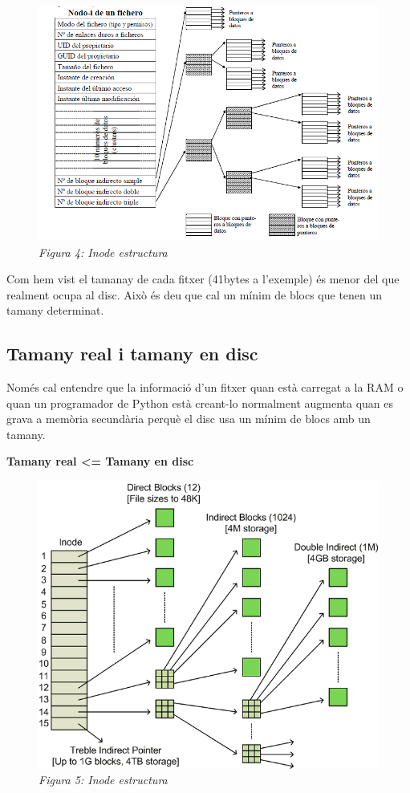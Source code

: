 \documentclass[
  12 pt,
  a4paper,
]{article}
\begin{document}
\begin{figure}
\centering
\includegraphics{png/inodo_estructura.png}
\caption{\emph{Figura 4: Inode estructura}}
\end{figure}

Com hem vist el tamanay de cada fitxer (41bytes a l'exemple) és menor
del que realment ocupa al disc. Això és deu que cal un mínim de blocs
que tenen un tamany determinat.

\subsection{Tamany real i tamany en
disc}\label{tamany-real-i-tamany-en-disc}

Només cal entendre que la informació d'un fitxer quan està carregat a la
RAM o quan un programador de Python està creant-lo normalment augmenta
quan es grava a memòria secundària perquè el disc usa un mínim de blocs
amb un tamany.

\textbf{Tamany real \textless= Tamany en disc}

\begin{figure}
\centering
\includegraphics{png/tabla-inodo.png}
\caption{\emph{Figura 5: Inode estructura}}
\end{figure}
\end{document}
